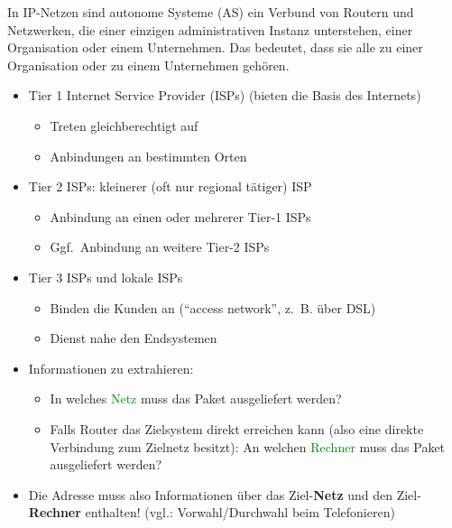 
In IP-Netzen sind autonome Systeme (AS) ein Verbund von Routern und Netzwerken, die einer einzigen administrativen Instanz unterstehen, einer Organisation oder einem Unternehmen.
Das bedeutet, dass sie alle zu einer Organisation oder zu einem Unternehmen gehören.

\begin{itemize}
    \item Tier 1 Internet Service Provider (ISPs) (bieten die Basis des Internets)
    \begin{itemize}
        \item Treten gleichberechtigt auf
        \item Anbindungen an bestimmten Orten
    \end{itemize}
    \item Tier 2 ISPs: kleinerer (oft nur regional tätiger) ISP
    \begin{itemize}
        \item Anbindung an einen oder mehrerer Tier-1 ISPs
        \item Ggf.\ Anbindung an weitere Tier-2 ISPs
    \end{itemize}
    \item Tier 3 ISPs und lokale ISPs
    \begin{itemize}
        \item Binden die Kunden an (“access network”, z.\ B. über DSL)
        \item Dienst nahe den Endsystemen
    \end{itemize}
\end{itemize}

\begin{itemize}
    \item Informationen zu extrahieren:
    \begin{itemize}
        \item In welches \textcolor{green}{Netz} muss das Paket ausgeliefert werden?
        \item Falls Router das Zielsystem direkt erreichen kann (also eine direkte Verbindung zum Zielnetz besitzt): An welchen \textcolor{green}{Rechner} muss das Paket ausgeliefert werden?
    \end{itemize}
    \item Die Adresse muss also Informationen über das Ziel-\textbf{Netz} und den Ziel-\textbf{Rechner} enthalten! (vgl.: Vorwahl/Durchwahl beim Telefonieren)
\end{itemize}


